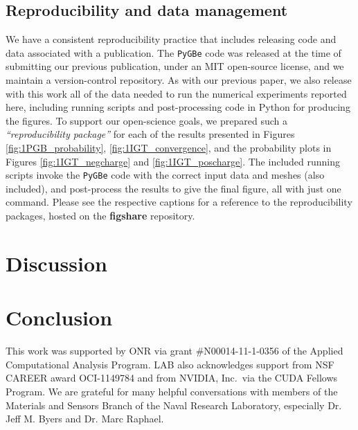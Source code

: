 \documentclass[aip,reprint]{revtex4-1}
\newcommand{\pygbe}{\texttt{PyGBe}\xspace}
\begin{document}
\subsection{Reproducibility and data management}
We have a consistent reproducibility practice that includes releasing code and data associated with a publication. The \pygbe code was released at the time of submitting our previous publication,\cite{CooperBardhanBarba2013} under an MIT open-source license, and we maintain a version-control repository. As with our previous paper, we also release with this work all of the data needed to run the numerical experiments reported here, including running scripts and post-processing code in Python for producing the figures. To support our open-science goals, we prepared such a \emph{``reproducibility package''} for each of the results presented in Figures \ref{fig:1PGB_probability}, \ref{fig:1IGT_convergence}, and the probability plots in Figures \ref{fig:1IGT_negcharge} and \ref{fig:1IGT_poscharge}. The included running scripts invoke the \pygbe code with the correct input data and meshes (also included), and post-process the results to give the final figure, all with just one command. Please see the respective captions for a reference to the reproducibility packages, hosted on the \textbf{figshare} repository.

\section{Discussion} \label{sec:discussion}


\section{Conclusion}





\begin{acknowledgments}
 This work was supported by ONR via grant \#N00014-11-1-0356 of the Applied Computational Analysis Program. LAB also acknowledges support from NSF CAREER award OCI-1149784 and from NVIDIA, Inc.\ via the CUDA Fellows Program. 
 We are grateful for many helpful conversations with members of the Materials and Sensors Branch of the Naval Research Laboratory, especially Dr. Jeff M. Byers and Dr. Marc Raphael.
\end{acknowledgments}


\end{document}
